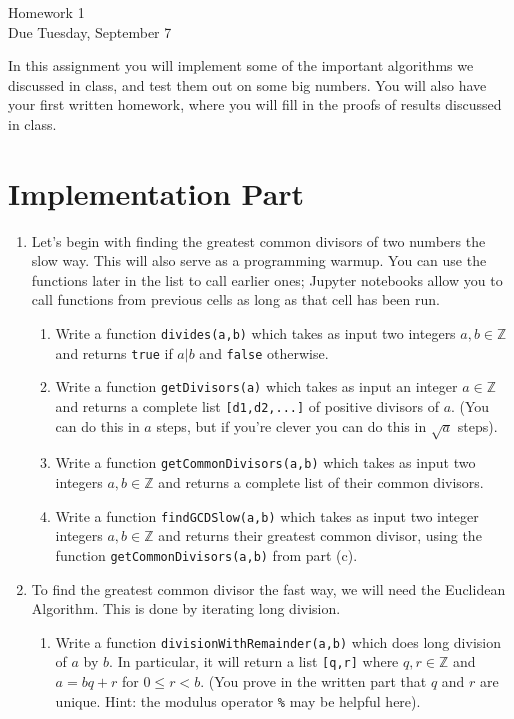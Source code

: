 \documentclass[11pt]{article}
\newcommand{\bZ}{\mathbb{Z}}
\begin{document}
\begin{center}
\Large {Homework 1}\\
\small {Due Tuesday, September 7}
\end{center}
In this assignment you will implement some of the important algorithms we discussed in class, and test them out on some big numbers.  You will also have your first written homework, where you will fill in the proofs of results discussed in class.
\section*{Implementation Part}
\begin{enumerate}
  \item{
  Let's begin with finding the greatest common divisors of two numbers the slow way.  This will also serve as a programming warmup.  You can use the functions later in the list to call earlier ones; Jupyter notebooks allow you to call functions from previous cells as long as that cell has been run.
  \begin{enumerate}
    \item{
    Write a function \verb|divides(a,b)| which takes as input two integers $a,b\in\bZ$ and returns \verb|true| if $a|b$ and \verb|false| otherwise.
    }
    \item{
    Write a function \verb|getDivisors(a)| which takes as input an integer $a\in\bZ$ and returns a complete list \verb|[d1,d2,...]| of positive divisors of $a$.  (You can do this in $a$ steps, but if you're clever you can do this in $\sqrt a$ steps).
    }
    \item{
    Write a function \verb|getCommonDivisors(a,b)| which takes as input two integers $a,b\in\bZ$ and returns a complete list of their common divisors.
    }
    \item{
    Write a function \verb|findGCDSlow(a,b)| which takes as input two integer integers $a,b\in\bZ$ and returns their greatest common divisor, using the function \verb|getCommonDivisors(a,b)| from part (c).
    }
  \end{enumerate}
  }
  \item{
  To find the greatest common divisor the fast way, we will need the Euclidean Algorithm.  This is done by iterating long division.
  \begin{enumerate}
    \item{
    Write a function \verb|divisionWithRemainder(a,b)| which does long division of $a$ by $b$.  In particular, it will return a list \verb|[q,r]| where $q,r\in\bZ$ and $a=bq + r$ for $0\le r<b$.  (You prove in the written part that $q$ and $r$ are unique.  Hint: the modulus operator \verb|%| may be helpful here).
}
\end{enumerate}}
\end{enumerate}
\end{document}
